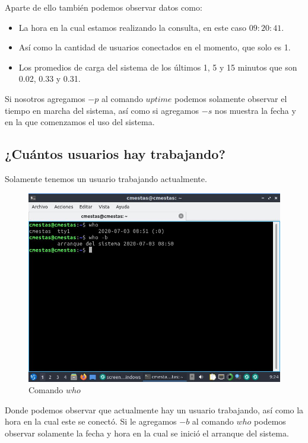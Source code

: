\documentclass[12pt]{article}
\begin{document}
Aparte de ello también podemos observar datos como:

\begin{itemize}
    \item La hora en la cual estamos realizando la consulta, en este caso $09:20:41$.
    \item Así como la cantidad de usuarios conectados en el momento, que solo es 1.
    \item Los promedios de carga del sistema de los últimos 1, 5 y 15 minutos que son 0.02, 0.33 y 0.31.
\end{itemize}

Si nosotros agregamos $-p$ al comando $uptime$ podemos solamente observar el tiempo en marcha del sistema, así como si agregamos $-s$ nos muestra la fecha y en la que comenzamos el uso del sistema.

\clearpage
\newpage

\subsection{¿Cuántos usuarios hay trabajando?}
Solamente tenemos un usuario trabajando actualmente.

\begin{figure}[h]
    \centering
    \includegraphics[width=1\textwidth]{images/screenA02.jpg}
    \caption{Comando $who$}
\end{figure}

Donde podemos observar que actualmente hay un usuario trabajando, así como la hora en la cual este se conectó.
Si le agregamos $-b$ al comando $who$ podemos observar solamente la fecha y hora en  la cual se inició el arranque del sistema.
\end{document}
